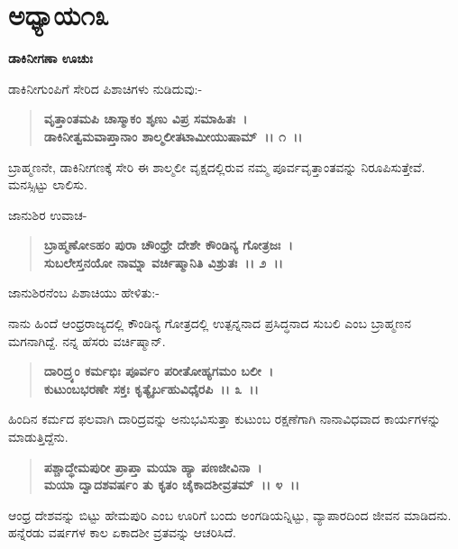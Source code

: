 \newpage

\section*{ಅಧ್ಯಾಯ\enginline{-}೧೩}

\emptypage

\begin{flushleft}
\textbf{ಡಾಕಿನೀಗಣಾ ಊಚುಃ\enginline{-}}
\end{flushleft}

ಡಾಕಿನೀಗುಂಪಿಗೆ ಸೇರಿದ ಪಿಶಾಚಿಗಳು ನುಡಿದುವು:-

\begin{verse}
\textbf{ವೃತ್ತಾಂತಮಪಿ ಚಾಸ್ಮಾಕಂ ಶೃಣು ವಿಪ್ರ ಸಮಾಹಿತಃ~।}\\\textbf{ಡಾಕಿನೀತ್ವಮವಾಪ್ತಾನಾಂ ಶಾಲ್ಮಲೀತಟಾಮೀಯುಷಾಮ್~।। ೧~।।}
\end{verse}

ಬ್ರಾಹ್ಮಣನೇ, ಡಾಕಿನೀಗಣಕ್ಕೆ ಸೇರಿ ಈ ಶಾಲ್ಮಲೀ ವೃಕ್ಷದಲ್ಲಿರುವ ನಮ್ಮ ಪೂರ್ವವೃತ್ತಾಂತವನ್ನು ನಿರೂಪಿಸುತ್ತೇವೆ. ಮನಸ್ಸಿಟ್ಟು ಲಾಲಿಸು.

\begin{flushleft}
ಜಾನುಶಿರ ಉವಾಚ-
\end{flushleft}

\begin{verse}
\textbf{ಬ್ರಾಹ್ಮಣೋಽಹಂ ಪುರಾ ಚೌಂಧ್ರೇ ದೇಶೇ ಕೌಂಡಿನ್ಯ ಗೋತ್ರಜಃ~।}\\\textbf{ಸುಬಲೇಸ್ತನಯೋ ನಾಮ್ನಾ ವರ್ಚಿಷ್ಮಾನಿತಿ ವಿಶ್ರುತಃ~।। ೨~।।}
\end{verse}

ಜಾನುಶಿರನೆಂಬ ಪಿಶಾಚಿಯು ಹೇಳಿತು:-

ನಾನು ಹಿಂದೆ ಆಂಧ್ರರಾಜ್ಯದಲ್ಲಿ ಕೌಂಡಿನ್ಯ ಗೋತ್ರದಲ್ಲಿ ಉತ್ಪನ್ನನಾದ ಪ್ರಸಿದ್ಧನಾದ ಸುಬಲಿ ಎಂಬ ಬ್ರಾಹ್ಮಣನ ಮಗನಾಗಿದ್ದೆ. ನನ್ನ ಹೆಸರು ವರ್ಚಿಷ್ಮಾನ್.

\begin{verse}
\textbf{ದಾರಿದ್ರ್ಯಂ ಕರ್ಮಭಿಃ ಪೂರ್ವಂ ಪರೀತೋಹ್ಯಗಮಂ ಬಲೀ~।}\\\textbf{ಕುಟುಂಬಭರಣೇ ಸಕ್ತಃ ಕೃತ್ಯೈರ್ಬಹುವಿಧೈರಪಿ~।। ೩~।।}
\end{verse}

ಹಿಂದಿನ ಕರ್ಮದ ಫಲವಾಗಿ ದಾರಿದ್ರವನ್ನು ಅನುಭವಿಸುತ್ತಾ ಕುಟುಂಬ ರಕ್ಷಣೆಗಾಗಿ ನಾನಾವಿಧವಾದ ಕಾರ್ಯಗಳನ್ನು ಮಾಡುತ್ತಿದ್ದೆನು.

\begin{verse}
\textbf{ಪಶ್ಚಾದ್ಧೇಮಪುರೀ ಪ್ರಾಪ್ತಾ ಮಯಾ ಹ್ಯಾ ಪಣಜೀವಿನಾ~।}\\\textbf{ಮಯಾ ದ್ವಾದಶವರ್ಷಂ ತು ಕೃತಂ ಚೈಕಾದಶೀವ್ರತಮ್~।। ೪~।।}
\end{verse}

ಆಂಧ್ರ ದೇಶವನ್ನು ಬಿಟ್ಟು ಹೇಮಪುರಿ ಎಂಬ ಊರಿಗೆ ಬಂದು ಅಂಗಡಿಯನ್ನಿಟ್ಟು, ವ್ಯಾಪಾರದಿಂದ ಜೀವನ ಮಾಡಿದನು. ಹನ್ನೆರಡು ವರ್ಷಗಳ ಕಾಲ ಏಕಾದಶೀ ವ್ರತವನ್ನು ಆಚರಿಸಿದೆ.

